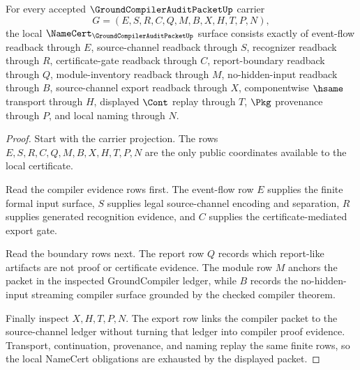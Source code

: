\begin{theorem}
\label{thm:groundcompiler-audit-packet-namecert-obligations}
For every accepted $\GroundCompilerAuditPacketUp$ carrier
$$
G=(E,S,R,C,Q,M,B,X,H,T,P,N),
$$
the local $\NameCert_{\GroundCompilerAuditPacketUp}$ surface consists exactly of event-flow readback through $E$, source-channel readback through $S$, recognizer readback through $R$, certificate-gate readback through $C$, report-boundary readback through $Q$, module-inventory readback through $M$, no-hidden-input readback through $B$, source-channel export readback through $X$, componentwise $\hsame$ transport through $H$, displayed $\Cont$ replay through $T$, $\Pkg$ provenance through $P$, and local naming through $N$.
\end{theorem}
\begin{proof}
Start with the carrier projection. The rows $E,S,R,C,Q,M,B,X,H,T,P,N$ are the only public coordinates available to the local certificate.

Read the compiler evidence rows first. The event-flow row $E$ supplies the finite formal input surface, $S$ supplies legal source-channel encoding and separation, $R$ supplies generated recognition evidence, and $C$ supplies the certificate-mediated export gate.

Read the boundary rows next. The report row $Q$ records which report-like artifacts are not proof or certificate evidence. The module row $M$ anchors the packet in the inspected GroundCompiler ledger, while $B$ records the no-hidden-input streaming compiler surface grounded by the checked compiler theorem.

Finally inspect $X,H,T,P,N$. The export row links the compiler packet to the source-channel ledger without turning that ledger into compiler proof evidence. Transport, continuation, provenance, and naming replay the same finite rows, so the local NameCert obligations are exhausted by the displayed packet.
\end{proof}

